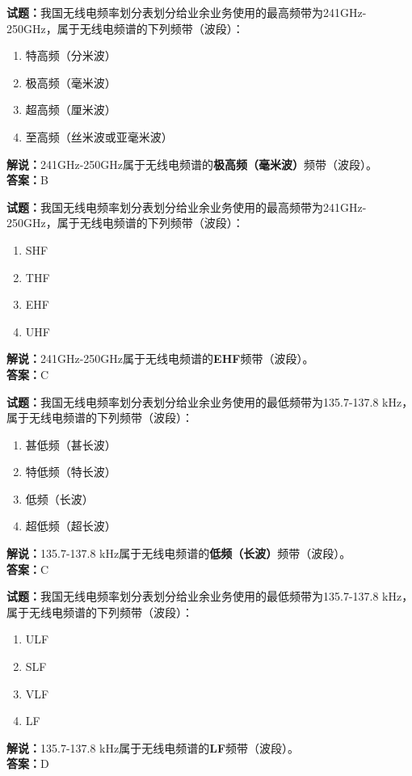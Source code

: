 \documentclass{ctexbook}
\begin{document}
\bigskip




\noindent\textbf{试题：}我国无线电频率划分表划分给业余业务使用的最高频带为241\unit{\GHz}-250\unit{\GHz}，属于无线电频谱的下列频带（波段）：
\begin{enumerate}[leftmargin=3em]
\item 特高频（分米波）
\item 极高频（毫米波）
\item 超高频（厘米波）
\item 至高频（丝米波或亚毫米波）
\end{enumerate}
\noindent\textbf{解说：}241\unit{\GHz}-250\unit{\GHz}属于无线电频谱的\textbf{极高频（毫米波）}频带（波段）。\\\noindent\textbf{答案：}B

\bigskip




\noindent\textbf{试题：}我国无线电频率划分表划分给业余业务使用的最高频带为241\unit{\GHz}-250\unit{\GHz}，属于无线电频谱的下列频带（波段）：
\begin{enumerate}[leftmargin=3em]
\item SHF
\item THF
\item EHF
\item UHF
\end{enumerate}
\noindent\textbf{解说：}241\unit{\GHz}-250\unit{\GHz}属于无线电频谱的\textbf{EHF}频带（波段）。\\\noindent\textbf{答案：}C

\bigskip




\noindent\textbf{试题：}我国无线电频率划分表划分给业余业务使用的最低频带为135.7-137.8 \unit{\kHz}，属于无线电频谱的下列频带（波段）：
\begin{enumerate}[leftmargin=3em]
\item 甚低频（甚长波）
\item 特低频（特长波）
\item 低频（长波）
\item 超低频（超长波）
\end{enumerate}
\noindent\textbf{解说：}135.7-137.8 \unit{\kHz}属于无线电频谱的\textbf{低频（长波）}频带（波段）。\\\noindent\textbf{答案：}C

\bigskip




\noindent\textbf{试题：}我国无线电频率划分表划分给业余业务使用的最低频带为135.7-137.8 \unit{\kHz}，属于无线电频谱的下列频带（波段）：
\begin{enumerate}[leftmargin=3em]
\item ULF
\item SLF
\item VLF
\item LF
\end{enumerate}
\noindent\textbf{解说：}135.7-137.8 \unit{\kHz}属于无线电频谱的\textbf{LF}频带（波段）。\\\noindent\textbf{答案：}D
\end{document}

